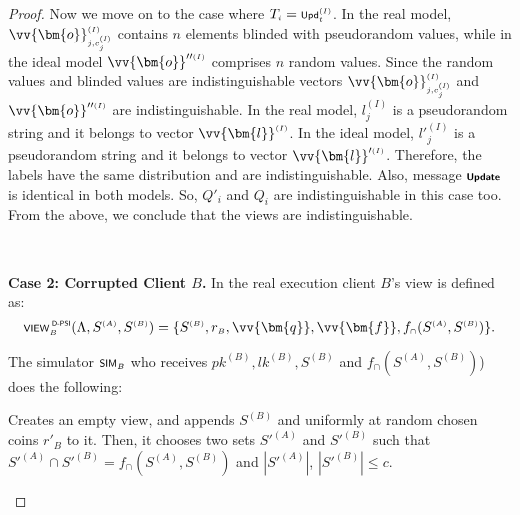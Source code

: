 \begin{proof}
Now we move on to the case where $T_{\scriptscriptstyle i}= \textsf {\scriptsize Upd}^{\scriptscriptstyle (I)}_{\scriptscriptstyle t}$. In the real model, $\vv{\bm{o}}^{\scriptscriptstyle (I)}_{\scriptscriptstyle j,c^{ {\text{\tiny (\textit{I})}}}_{\tiny j}}$ contains $n$ elements blinded with pseudorandom values, while in the ideal model $\vv{\bm{o}}''^{\scriptscriptstyle (I)}$ comprises  $n$ random values. Since the random values and blinded values are  indistinguishable  vectors $\vv{\bm{o}}^{\scriptscriptstyle (I)}_{\scriptscriptstyle j,c^{ {\text{\tiny (\textit{I})}}}_{\tiny j}}$ and $\vv{\bm{o}}''^{\scriptscriptstyle (I)}$ are indistinguishable. In the real model, $l^{\scriptscriptstyle (I)}_{\scriptscriptstyle j}$ is a pseudorandom string and it belongs to vector $\vv{\bm{l}}^{\scriptscriptstyle (I)}$. In the ideal model, $l'^{\scriptscriptstyle (I)}_{\scriptscriptstyle j}$ is a pseudorandom string and it belongs to vector $\vv{\bm{l}}'^{\scriptscriptstyle (I)}$. Therefore, the labels have the same distribution and are   indistinguishable. Also,  message $\textsf {\scriptsize \textbf{Update}}$ is identical in both models. So, $Q'_{\scriptscriptstyle i}$ and $Q_{\scriptscriptstyle i}$ are indistinguishable in this case too. From the above, we conclude that the views are indistinguishable. 

\
\vspace{-2mm}

\noindent\textbf{Case 2: Corrupted Client $B$.} In the real execution client $B$'s view is defined as:
\begin{equation*}
 \textsf {\scriptsize VIEW}^{\scriptscriptstyle\textsf { D-PSI}}_{\scriptscriptstyle B}(\Lambda, S^{\scriptscriptstyle (A)},S^{\scriptscriptstyle (B)})=\{S^{\scriptscriptstyle (B)}, r_{\scriptscriptstyle B}, \vv{\bm{q}}, \vv{\bm{f}}, f_{\scriptscriptstyle \cap}(S^{\scriptscriptstyle (A)},S^{\scriptscriptstyle (B)})\}. 
\end{equation*}

The simulator $\textsf {\scriptsize SIM}_{\scriptscriptstyle B}$ who receives $pk^{\scriptscriptstyle (B)}, lk^{\scriptscriptstyle (B)}, S^{\scriptscriptstyle (B)}$ and $f_{\scriptscriptstyle \cap}(S^{\scriptscriptstyle (A)},S^{\scriptscriptstyle (B)})$) does the following: 
\begin{packed_enum}
\item Creates an empty view, and appends $S^{\scriptscriptstyle (B)}$ and  uniformly at random chosen coins $r'_{\scriptscriptstyle B}$ to it. Then, it chooses two sets $S'^{\scriptscriptstyle (A)}$ and $S'^{\scriptscriptstyle (B)}$ such that $S'^{\scriptscriptstyle (A)}\cap S'^{\scriptscriptstyle (B)}=f_{\scriptscriptstyle \cap}(S^{\scriptscriptstyle (A)},S^{\scriptscriptstyle (B)})$ and $|S'^{\scriptscriptstyle (A)}|$, $|S'^{\scriptscriptstyle (B)}|\leq c$. 


\end{packed_enum}
\end{proof}

